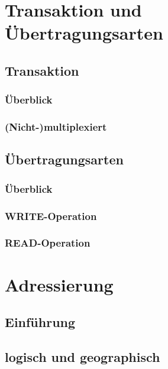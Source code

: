 \section{Transaktion und Übertragungsarten}
\subsection{Transaktion}
\subsubsection{Überblick}
\subsubsection*{(Nicht-)multiplexiert}

\subsection{Übertragungsarten}
\subsubsection{Überblick}
\subsubsection{WRITE-Operation}
\subsubsection{READ-Operation}

\section{Adressierung}
\subsection{Einführung}

\subsection{logisch und geographisch}

